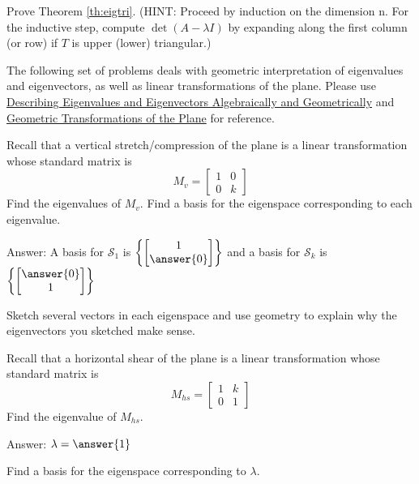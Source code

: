 \documentclass{ximera}
\begin{document}
\begin{problem}\label{prob:eigtri}
Prove Theorem \ref{th:eigtri}.  (HINT:  Proceed by induction on the dimension n.  For the inductive step, compute $\det(A-\lambda I)$ by expanding along the first column (or row) if $T$ is upper (lower) triangular.)
\end{problem}

\begin{problem}
The following set of problems deals with geometric interpretation of eigenvalues and eigenvectors, as well as linear transformations of the plane.  Please use \href{https://ximera.osu.edu/oerlinalg/LinearAlgebra/EIG-0010/main}{Describing Eigenvalues and Eigenvectors Algebraically and Geometrically} and \href{https://ximera.osu.edu/oerlinalg/LinearAlgebra/LTR-0070/main}{Geometric Transformations of the Plane} for reference.
\begin{problem}\label{prob:eigvectorstransfr2_1}
Recall that a vertical stretch/compression of the plane is a linear transformation whose standard matrix is $$M_v=\begin{bmatrix}1&0\\0&k\end{bmatrix}$$
Find the eigenvalues of $M_v$.  Find a basis for the eigenspace corresponding to each eigenvalue.

Answer:  A basis for $\mathcal{S}_1$ is $\left\{\begin{bmatrix}1\\\answer{0}\end{bmatrix}\right\}$
and a basis for $\mathcal{S}_k$ is $\left\{\begin{bmatrix}\answer{0}\\1\end{bmatrix}\right\}$

Sketch several vectors in each eigenspace and use geometry to explain why the eigenvectors you sketched make sense.
\end{problem}

\begin{problem}\label{prob:eigvectorstransfr2_2}
Recall that a horizontal shear of the plane is a linear transformation whose standard matrix is $$M_{hs}=\begin{bmatrix}1&k\\0&1\end{bmatrix}$$
Find the eigenvalue of $M_{hs}$.  

Answer: $\lambda=\answer{1}$

Find a basis for the eigenspace corresponding to $\lambda$.


\end{problem}
\end{problem}
\end{document}
